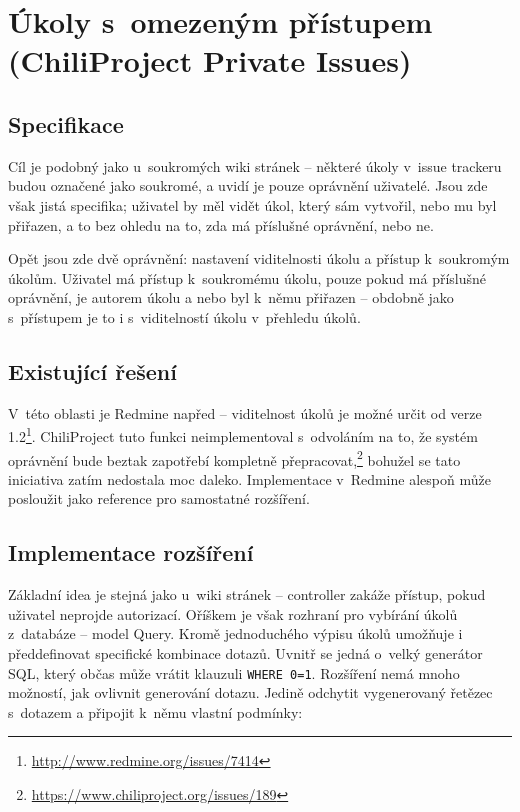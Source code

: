 \documentclass[thesis=B,czech]{FITthesis}[2012/05/02]
\begin{document}
\section[Úkoly s~omezeným přístupem]{Úkoly s~omezeným přístupem (ChiliProject Private Issues)}
\label{sec:private_issues}

\subsection{Specifikace}

Cíl je podobný jako u~soukromých wiki stránek -- některé úkoly v~issue
trackeru budou označené jako soukromé, a uvidí je pouze oprávnění
uživatelé. Jsou zde však jistá specifika; uživatel by měl vidět úkol,
který sám vytvořil, nebo mu byl přiřazen, a to bez ohledu na to,
zda má příslušné oprávnění, nebo ne.

Opět jsou zde dvě oprávnění: nastavení viditelnosti úkolu a přístup
k~soukromým úkolům. Uživatel má přístup k~soukromému úkolu, pouze pokud má
příslušné oprávnění, je autorem úkolu a nebo byl k~němu přiřazen --
obdobně jako s~přístupem je to i s~viditelností úkolu v~přehledu úkolů.

\subsection{Existující řešení}
\label{sec:private_issues_exist}

V~této oblasti je Redmine napřed -- viditelnost úkolů je možné určit od
verze 1.2\footnote{\url{http://www.redmine.org/issues/7414}}.
ChiliProject tuto funkci neimplementoval s~odvoláním na to, že systém
oprávnění bude beztak zapotřebí kompletně přepracovat,\footnote{\url{https://www.chiliproject.org/issues/189}}
bohužel se tato iniciativa zatím nedostala moc daleko. Implementace
v~Redmine alespoň může posloužit jako reference pro samostatné
rozšíření.

\subsection{Implementace rozšíření}

Základní idea je stejná jako u~wiki stránek -- controller zakáže přístup,
pokud uživatel neprojde autorizací. Oříškem je však rozhraní pro
vybírání úkolů z~databáze -- model Query. Kromě jednoduchého výpisu
úkolů umožňuje i předdefinovat specifické kombinace dotazů. Uvnitř se
jedná o~velký generátor SQL, který občas může vrátit klauzuli
\lstinline!WHERE 0=1!. Rozšíření nemá mnoho možností, jak ovlivnit
generování dotazu. Jedině odchytit vygenerovaný řetězec
s~dotazem a připojit k~němu vlastní podmínky:
\end{document}
